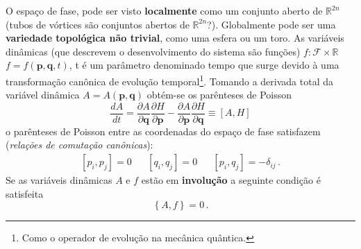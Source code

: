 \documentclass[25pt]{article}
\numberwithin{equation}{subsection} %
\newcommand{\poisson}[2]{\left\{#1,#2\right\}}
\begin{document}
\bigbreak
O espaço de fase, pode ser visto \textbf{localmente} como um conjunto aberto de $\mathbb{R}^{2n}$ (tubos de vórtices são conjuntos abertos de $\mathbb{R}^{2n}$?). Globalmente pode ser uma \textbf{variedade topológica não trivial}, como uma esfera ou um toro.
\bigbreak
As variáveis dinâmicas (que descrevem o desenvolvimento do sistema são funções) $f:\mathcal{F}\times\mathbb{R}$ $f=f(\mathbf{p},\mathbf{q},t)$, t é um parâmetro denominado tempo que surge devido à uma transformação canônica de evolução temporal\footnote{Como o operador de evolução na mecânica quântica.}. Tomando a derivada total da variável dinâmica $A=A\left(\mathbf{p},\mathbf{q}\right)$ obtém-se os parênteses de Poisson
\begin{equation}
\frac{dA}{dt}=\frac{\partial A}{\partial \mathbf{q}}\frac{\partial H}{\partial \mathbf{p}}-\frac{\partial A}{\partial \mathbf{p}}\frac{\partial H}{\partial \mathbf{q}}\equiv\left[A,H\right]
\end{equation}
o parênteses de Poisson entre as coordenadas do espaço de fase satisfazem (\textit{relações de comutação canônicas}):
\begin{align*}
\left[p_i,p_j\right]=0&&\left[q_i,q_j\right]=0&&\left[p_i,q_j\right]=-\delta_{ij}\,.
\end{align*}
Se as variáveis dinâmicas $A$ e $f$ estão em \textbf{involução} a seguinte condição é satisfeita
\begin{displaymath}
\poisson{A}{f}=0\,.
\end{displaymath}
\end{document}
